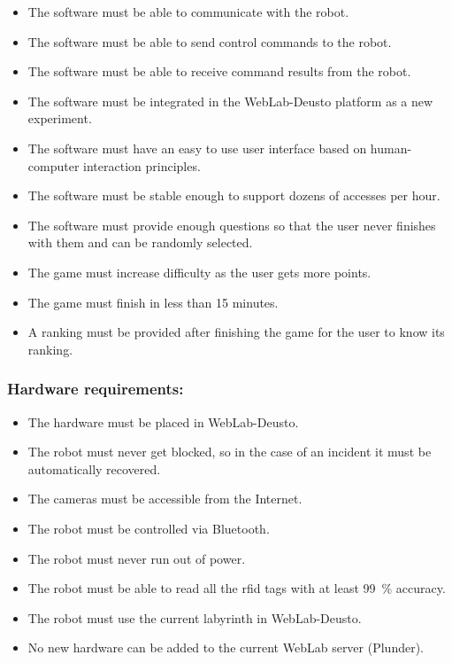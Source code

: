 \begin{itemize}
	\item The software must be able to communicate with the robot.
	\item The software must be able to send control commands to the robot.
	\item The software must be able to receive command results from the robot.
	\item The software must be integrated in the WebLab-Deusto platform as a new experiment.
	\item The software must have an easy to use user interface based on human-computer interaction
	principles.
	\item The software must be stable enough to support dozens of accesses per hour.
	\item The software must provide enough questions so that the user never finishes with them and
	can be randomly selected.
	\item The game must increase difficulty as the user gets more points.
	\item The game must finish in less than 15 minutes.
	\item A ranking must be provided after finishing the game for the user to know its ranking.
\end{itemize}

\subsubsection{Hardware requirements:}

\begin{itemize}
	\item The hardware must be placed in WebLab-Deusto.
	\item The robot must never get blocked, so in the case of an incident it must be automatically
	recovered.
	\item The cameras must be accessible from the Internet.
	\item The robot must be controlled via Bluetooth.
	\item The robot must never run out of power.
	\item The robot must be able to read all the \acrshort{rfid} tags with at least 99~\% accuracy.
	\item The robot must use the current labyrinth in WebLab-Deusto.
	\item No new hardware can be added to the current WebLab server (Plunder).
\end{itemize}

